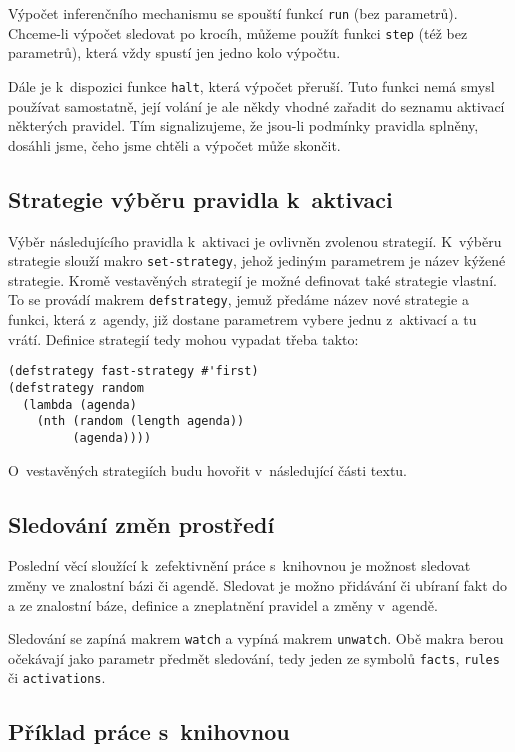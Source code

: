 Výpočet inferenčního mechanismu se spouští funkcí \verb|run| (bez parametrů).
Chceme-li výpočet sledovat po krocíh, můžeme použít funkci \verb|step| (též bez
parametrů), která vždy spustí jen jedno kolo výpočtu.

Dále je k~dispozici funkce \verb|halt|, která výpočet přeruší. Tuto funkci nemá
smysl používat samostatně, její volání je ale někdy vhodné zařadit do seznamu
aktivací některých pravidel. Tím signalizujeme, že jsou-li podmínky pravidla
splněny, dosáhli jsme, čeho jsme chtěli a výpočet může skončit.

\subsection{Strategie výběru pravidla k~aktivaci}
Výběr následujícího pravidla k~aktivaci je ovlivněn zvolenou strategií.
K~výběru strategie slouží makro \verb|set-strategy|, jehož jediným parametrem je
název kýžené strategie.
Kromě vestavěných strategií je možné definovat také strategie vlastní. To se
provádí makrem \verb|defstrategy|, jemuž předáme název nové strategie a
funkci, která z~agendy, již dostane parametrem vybere jednu z~aktivací a tu
vrátí. Definice strategií tedy mohou vypadat třeba takto:
\begin{verbatim}
(defstrategy fast-strategy #'first)
(defstrategy random
  (lambda (agenda)
    (nth (random (length agenda))
         (agenda))))
\end{verbatim}
O~vestavěných strategiích budu hovořit v~následující části textu.
\subsection{Sledování změn prostředí}
\label{watchers}
Poslední věcí sloužící k~zefektivnění práce s~knihovnou je možnost sledovat
změny ve znalostní bázi či agendě. Sledovat je možno přidávání či ubíraní fakt
do a ze znalostní báze, definice a zneplatnění pravidel a změny v~agendě.

Sledování se zapíná makrem \verb|watch| a vypíná makrem \verb|unwatch|. Obě
makra berou očekávají jako parametr předmět sledování, tedy jeden ze symbolů
\verb|facts|, \verb|rules| či \verb|activations|.
\subsection{Příklad práce s~knihovnou}

